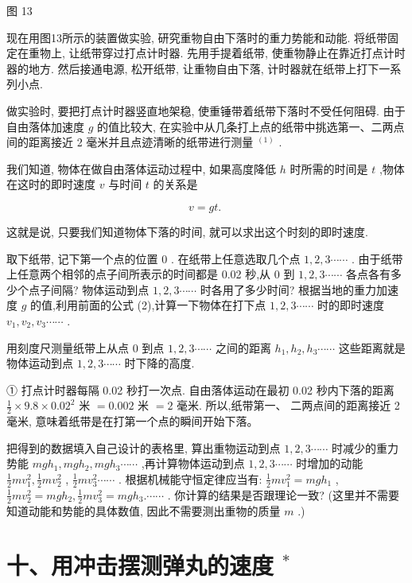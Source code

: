 \documentclass[10pt]{article}
\begin{document}
图 13

现在用图13所示的装置做实验, 研究重物自由下落时的重力势能和动能. 将纸带固定在重物上, 让纸带穿过打点计时器. 先用手提着纸带, 使重物静止在靠近打点计时器的地方. 然后接通电源, 松开纸带, 让重物自由下落, 计时器就在纸带上打下一系列小点.

做实验时, 要把打点计时器竖直地架稳, 使重锤带着纸带下落时不受任何阻碍. 由于自由落体加速度 \(g\) 的值比较大, 在实验中从几条打上点的纸带中挑选第一、二两点间的距离接近 2 毫米并且点迹清晰的纸带进行测量 \({}^{\left( 1\right) }\) .

我们知道, 物体在做自由落体运动过程中, 如果高度降低 \(h\) 时所需的时间是 \(t\) ,物体在这时的即时速度 \(v\) 与时间 \(t\) 的关系是

\[
v = {gt}\text{. } \tag{2}
\]

这就是说, 只要我们知道物体下落的时间, 就可以求出这个时刻的即时速度.

取下纸带, 记下第一个点的位置 0 . 在纸带上任意选取几个点 \(1,2,3\cdots \cdots\) . 由于纸带上任意两个相邻的点子间所表示的时间都是 0.02 秒,从 0 到 \(1,2,3\cdots \cdots\) 各点各有多少个点子间隔? 物体运动到点 \(1,2,3\cdots \cdots\) 时各用了多少时间? 根据当地的重力加速度 \(g\) 的值,利用前面的公式 (2),计算一下物体在打下点 \(1,2,3\cdots \cdots\) 时的即时速度 \({v}_{1},{v}_{2},{v}_{3}\cdots \cdots\) .

用刻度尺测量纸带上从点 0 到点 \(1,2,3\cdots \cdots\) 之间的距离 \({h}_{1},{h}_{2},{h}_{3}\cdots \cdots\) 这些距离就是物体运动到点 \(1,2,3\cdots \cdots\) 时下降的高度.

① 打点计时器每隔 0.02 秒打一次点. 自由落体运动在最初 0.02 秒内下落的距离 \(\frac{1}{2} \times {9.8} \times {0.02}^{2}\) 米 \(= {0.002}\) 米 \(= 2\) 毫米. 所以,纸带第一、 二两点间的距离接近 2 毫米, 意味着纸带是在打第一个点的瞬间开始下落。

把得到的数据填入自己设计的表格里, 算出重物运动到点 \(1,2,3\cdots \cdots\) 时减少的重力势能 \({mg}{h}_{1},{mg}{h}_{2},{mg}{h}_{3}\cdots \cdots\) ,再计算物体运动到点 \(1,2,3\cdots \cdots\) 时增加的动能 \(\frac{1}{2}m{v}_{1}^{2},\frac{1}{2}m{v}_{2}^{2}\) , \(\frac{1}{2}m{v}_{3}^{2}\cdots \cdots\) . 根据机械能守恒定律应当有: \(\frac{1}{2}m{v}_{1}^{2} = {mg}{h}_{1}\) , \(\frac{1}{2}m{v}_{2}^{2} = {mg}{h}_{2},\frac{1}{2}m{v}_{3}^{2} = {mg}{h}_{3}.\cdots \cdots\) . 你计算的结果是否跟理论一致? (这里并不需要知道动能和势能的具体数值, 因此不需要测出重物的质量 \(m\) .)

\section*{十、用冲击摆测弹丸的速度 \({}^{ * }\)}
\end{document}
